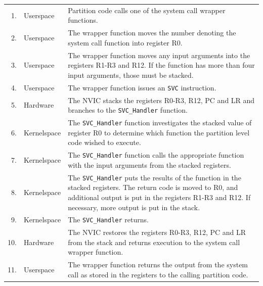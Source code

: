 \begin{tabular}{ r l p{10.5cm} }
    1. & Userspace & Partition code calls one of the system call wrapper
    functions.\\
    2. & Userspace & The wrapper function moves the number denoting the system
    call function into register R0.\\
    3. & Userspace & The wrapper function moves any input arguments into the
    registers R1-R3 and R12. If the function has more than four input arguments,
    those must be stacked.\\
    4. & Userspace & The wrapper function issues an \texttt{SVC} instruction.\\
    5. & Hardware & The NVIC stacks the registers R0-R3, R12, PC and LR and
    branches to the \texttt{SVC\_Handler} function.\\
    6. & Kernelspace & The \texttt{SVC\_Handler} function investigates the
    stacked value of register R0 to determine which function the partition level
    code wished to execute.\\
    7. & Kernelspace & The \texttt{SVC\_Handler} function calls the appropriate
    function with the input arguments from the stacked registers.\\
    8. & Kernelspace & The \texttt{SVC\_Handler} puts the results of the
    function in the stacked registers. The return code is moved to R0, and
    additional output is put in the registers R1-R3 and R12. If necessary, more
    output is put in the stack.\\
    9. & Kernelspace & The \texttt{SVC\_Handler} returns.\\
    10. & Hardware & The NVIC restores the registers R0-R3, R12, PC and LR from
    the stack and returns execution to the system call wrapper function.\\
    11. & Userspace & The wrapper function returns the output from the system
    call as stored in the registers to the calling partition code.\\
\end{tabular}\\


